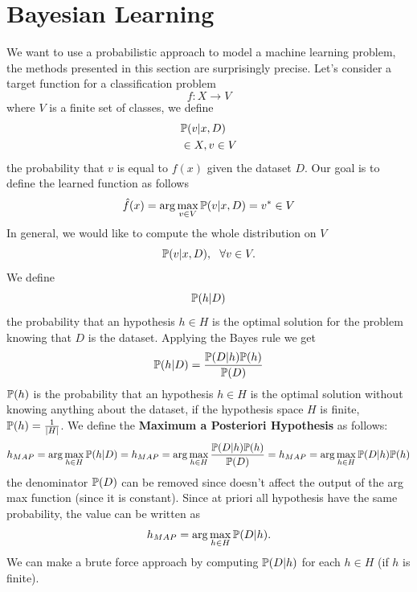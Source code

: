 \documentclass[10pt, letterpaper]{report}
\begin{document}
\section{Bayesian Learning}
We want to use a probabilistic approach to model a machine learning problem, the methods presented in this section are surprisingly precise. Let's consider a target function for a classification problem\begin{equation}
    f:X\rightarrow V 
\end{equation}
where $V$ is a finite set of classes, we define \begin{align}
    &{\mathbb P}(v|x,D)\\ &\in X, v\in V
\end{align}
the probability that $v$ is equal to $f(x)$ given the dataset $D$. Our goal is to define the learned function as follows\begin{equation}
    \hat f(x)=\arg\max_{v\in V}{\mathbb P}(v|x,D)=v^*\in V
\end{equation}
In general, we would like to compute the whole distribution on $V$\begin{equation}
   {\mathbb P}(v|x,D), \ \ \forall v\in V.
\end{equation}
We define\begin{equation}
    {\mathbb P}(h|D)
\end{equation}
the probability that an hypothesis $h\in H$ is the optimal solution for the problem knowing that $D$ is the dataset. Applying the Bayes rule we get\begin{equation}
    {\mathbb P}(h|D)=\frac{{\mathbb P}(D|h){\mathbb P}(h)}{{\mathbb P}(D)}
\end{equation}
${\mathbb P}(h)$ is the probability that an hypothesis $h\in H$ is the optimal solution without knowing anything about the dataset, if the hypothesis space  $H$ is finite, ${\mathbb P}(h)=\frac{1}{|H|}$. We define the \textbf{Maximum a Posteriori Hypothesis} as follows:\begin{equation}
    h_{MAP}=\arg\max_{h\in H}{\mathbb P}(h|D)= h_{MAP}=\arg\max_{h\in H}\frac{{\mathbb P}(D|h){\mathbb P}(h)}{{\mathbb P}(D)}= h_{MAP}=\arg\max_{h\in H}{\mathbb P}(D|h){\mathbb P}(h)
\end{equation}
the denominator ${\mathbb P}(D)$ can be removed since doesn't affect the output of the arg max function (since it is constant). Since at priori all hypothesis have the same probability, the value can be written as\begin{equation}
    h_{MAP}=\arg\max_{h\in H}{\mathbb P}(D|h).
\end{equation}
We can make a brute force approach by computing ${\mathbb P}(D|h)$ for each $h\in H$ (if $h$ is finite).
\end{document}
